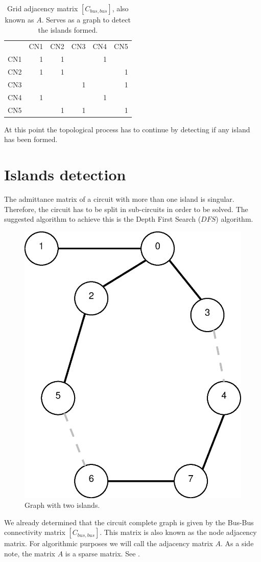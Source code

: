 \documentclass[nols,a4paper,twoside,notoc,fleqn]{tufte-book}
\begin{document}
\begin{table}[h!]
	\begin{tabular}{lrrrrr}
		{} &  CN1 &  CN2 &  CN3 &  CN4 &  CN5 \\
		CN1 &    1 &    1 &      &    1 &      \\
		CN2 &    1 &    1 &      &      &    1 \\
		CN3 &      &      &    1 &      &    1 \\
		CN4 &    1 &      &      &    1 &      \\
		CN5 &      &    1 &    1 &      &    1 \\
	\end{tabular}
	\caption{Grid adjacency matrix $[C_{bus, bus}]$, also known as $A$. Serves as a graph to detect the islands formed.}
\end{table}

\vspace{0.5cm}

At this point the topological process has to continue by detecting if any island has been formed.

\section{Islands detection}

The admittance matrix of a circuit with more than one island is singular. Therefore, the circuit has to be split in sub-circuits in order to be solved. The suggested algorithm to achieve this is the Depth First Search ($DFS$) algorithm.

\begin{figure}[h!]
	\centering
	\includegraphics[width=0.35\linewidth]{img/general_graph.eps}
	\caption{Graph with two islands.}
	\label{fig:general_graph}
\end{figure}


We already determined that the circuit complete graph is given by the Bus-Bus connectivity matrix $[C_{bus, bus}]$. This matrix is also known as the node adjacency matrix. For algorithmic purposes we will call the adjacency matrix $A$. As a side note, the matrix $A$ is a sparse matrix. See \cite{CSC_matrix}.
\end{document}
